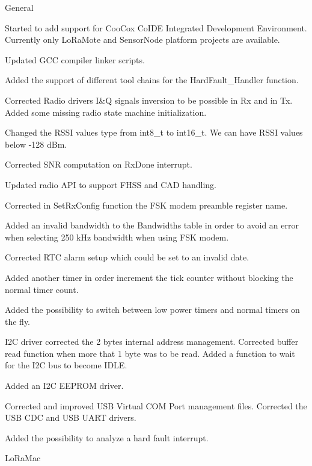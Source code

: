 \begin{DoxyItemize}
\item General
\begin{DoxyEnumerate}
\item Started to add support for Coo\+Cox Co\+I\+DE Integrated Development Environment. Currently only Lo\+Ra\+Mote and Sensor\+Node platform projects are available.
\item Updated G\+CC compiler linker scripts.
\item Added the support of different tool chains for the Hard\+Fault\+\_\+\+Handler function.
\item Corrected Radio drivers I\&Q signals inversion to be possible in Rx and in Tx. Added some missing radio state machine initialization.
\item Changed the R\+S\+SI values type from int8\+\_\+t to int16\+\_\+t. We can have R\+S\+SI values below -\/128 d\+Bm.
\item Corrected S\+NR computation on Rx\+Done interrupt.
\item Updated radio A\+PI to support F\+H\+SS and C\+AD handling.
\item Corrected in Set\+Rx\+Config function the F\+SK modem preamble register name.
\item Added an invalid bandwidth to the Bandwidths table in order to avoid an error when selecting 250 k\+Hz bandwidth when using F\+SK modem.
\item Corrected R\+TC alarm setup which could be set to an invalid date.
\item Added another timer in order increment the tick counter without blocking the normal timer count.
\item Added the possibility to switch between low power timers and normal timers on the fly.
\item I2C driver corrected the 2 bytes internal address management. Corrected buffer read function when more that 1 byte was to be read. Added a function to wait for the I2C bus to become I\+D\+LE.
\item Added an I2C E\+E\+P\+R\+OM driver.
\item Corrected and improved U\+SB Virtual C\+OM Port management files. Corrected the U\+SB C\+DC and U\+SB U\+A\+RT drivers.
\item Added the possibility to analyze a hard fault interrupt.
\end{DoxyEnumerate}
\item Lo\+Ra\+Mac
\begin{DoxyEnumerate}

\end{DoxyEnumerate}
\end{DoxyItemize}
